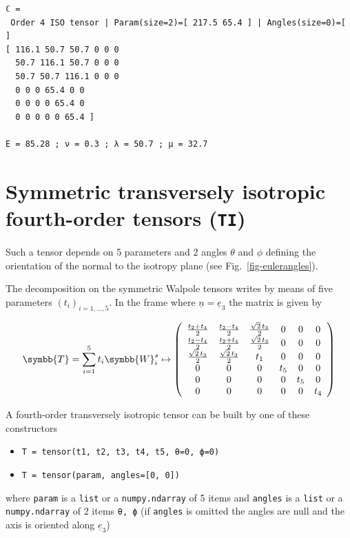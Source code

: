 \documentclass[
  a4paper,
  numbers=noendperiod,
  DIV=12]{scrreprt}
\providecommand{\tightlist}{%
  \setlength{\itemsep}{0pt}\setlength{\parskip}{0pt}}\usepackage{longtable,booktabs,array}
\newcommand{\uuuu}[1]{{\symbb{{#1}}}}
\newcommand{\uv}[1]{{\underline{{#1}}}}
\newcommand{\ve}[1]{{\uv{{e}}_{{#1}}}}
\begin{document}
\begin{verbatim}
ℂ =
 Order 4 ISO tensor | Param(size=2)=[ 217.5 65.4 ] | Angles(size=0)=[ ]
[ 116.1 50.7 50.7 0 0 0 
  50.7 116.1 50.7 0 0 0 
  50.7 50.7 116.1 0 0 0 
  0 0 0 65.4 0 0 
  0 0 0 0 65.4 0 
  0 0 0 0 0 65.4 ]

E = 85.28 ; ν = 0.3 ; λ = 50.7 ; μ = 32.7
\end{verbatim}

\section{\texorpdfstring{Symmetric transversely isotropic fourth-order
tensors
(\texttt{TI})}{Symmetric transversely isotropic fourth-order tensors (TI)}}\label{symmetric-transversely-isotropic-fourth-order-tensors-ti}

Such a tensor depends on 5 parameters and 2 angles \(\theta\) and
\(\phi\) defining the orientation of the normal to the isotropy plane
(see Fig.~\ref{fig-eulerangles}).

The decomposition on the symmetric Walpole tensors writes by means of
five parameters \((t_i)_{i=1,\ldots,5}\). In the frame where
\(\uv{n}=\ve{3}\) the matrix is given by

\[
\uuuu{T}=\sum_{i=1}^5 t_i \uuuu{W}^s_i
\mapsto
\left(
\begin{array}{cccccc}
\frac{t_2 + t_4}{2} & \frac{t_2 - t_4}{2} & \frac{\sqrt{2} \, t_3}{2} & 0 & 0 & 0 \\
\frac{t_2 - t_4}{2} & \frac{t_2 + t_4}{2} & \frac{\sqrt{2} \, t_3}{2} & 0 & 0 & 0 \\
\frac{\sqrt{2} \, t_3}{2} & \frac{\sqrt{2} \, t_3}{2} & t_1 & 0 & 0 & 0 \\
0 & 0 & 0 & t_5 & 0 & 0 \\
0 & 0 & 0 & 0 & t_5 & 0 \\
0 & 0 & 0 & 0 & 0 & t_4 \\
\end{array}
\right)
\]

A fourth-order transversely isotropic tensor can be built by one of
these constructors

\begin{itemize}
\tightlist
\item
  \texttt{T\ =\ tensor(t1,\ t2,\ t3,\ t4,\ t5,\ θ=0,\ ϕ=0)}
\item
  \texttt{T\ =\ tensor(param,\ angles={[}0,\ 0{]})}
\end{itemize}

where \texttt{param} is a \texttt{list} or a \texttt{numpy.ndarray} of 5
items and \texttt{angles} is a \texttt{list} or a \texttt{numpy.ndarray}
of 2 items \texttt{θ,\ ϕ} (if \texttt{angles} is omitted the angles are
null and the axis is oriented along \(\ve{3}\))
\end{document}
